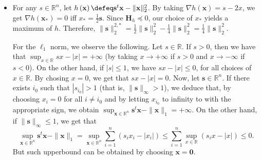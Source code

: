 \documentclass{article}
\begin{document}
   \begin{exo}
   \end{exo}
   \begin{itemize}
       \item For any $s \in \mathbb{R}^n$,
           let $h\left(\mathbf{x}\right) \defeq
           \mathbf{s}^t\mathbf{x} - \|\mathbf{x}\|^2_2$.
           By taking $\nabla h \left(
           \mathbf{x}\right) = s - 2x$, 
           we get $\nabla h\left(\mathbf{x_{*}}\right) = 0$ 
           iff $x_* = \frac{1}{2}\mathbf{s}$.
           Since $\mathbf{H}_{h} \preceq 0$,
           our choice of $x_*$ yields
           a maximum of $h$.
           Therefore,
           $\|\mathbf{s}\|_2^{2, *} = \frac{1}{2}\|\mathbf{s}\|_2^2
           - \frac{1}{4}\|\mathbf{s}\|_2^2
           = \frac{1}{4}\|\mathbf{s}\|^2_2$.
           
           For the $\ell_1$ norm, we observe the
           following.
           Let $s \in \mathbb{R}$. If $s > 0$,
           then we have that $\sup_{x \in \mathbb{R}}
           sx - \left|x\right| = +\infty$
           (by taking $x \rightarrow +\infty$ 
           if $s > 0$ and 
           $x \rightarrow -\infty$ 
           if $s < 0$).
           On the other hand,
           if $\left|s\right| \leq 1$,
           we have $sx - \left|x\right| \leq 0$,
           for all choices 
           of $x \in \mathbb{R}$.
           By chosing $x = 0$,
           we get that
           $sx - \left|x\right| = 0$.
           Now, let $\mathbf{s} \in \mathbb{R}^{n}$.
           If there exists $i_0$ 
           such that $\left|s_{i_0}\right| > 1$
           (that is, $\|\mathbf{s}\|_{\infty}
           > 1$), we deduce that,
           by choosing $x_{i} = 0$ 
           for all $i \neq i_0$
           and by letting $x_{i_0}$ 
           to infinity to with
           the appropriate sign,
           we obtain $\sup_{\mathbf{x} \in \mathbb{R}^{n}}
           \mathbf{s}^{t}\mathbf{x} - 
           \|\mathbf{x}\|_{1} = +\infty$.
           On the other hand,
           if $\|\mathbf{s}\|_{\infty} \leq 1$,
           we get that
           \begin{equation*}
               \sup_{\mathbf{x} \in \mathbb{R}^{n}}
               \mathbf{s}^{t}\mathbf{x}-
               \|\mathbf{x}\|_{1} =
               \sup_{\mathbf{x} \in \mathbb{R}^{n}}
               \sum_{i = 1}^{n}\left(
               s_{i}x_{i} - \left|x_{i}\right|
               \right) \leq 
               \sum_{i = 1}^{n}
               \sup_{x \in \mathbb{R}}
               \left(s_{i}x - \left|x\right|\right)
               \leq 0.
           \end{equation*}
           But such upperbound
           can be obtained by choosing
           $\mathbf{x} = \mathbf{0}$.


\end{itemize}
\end{document}
